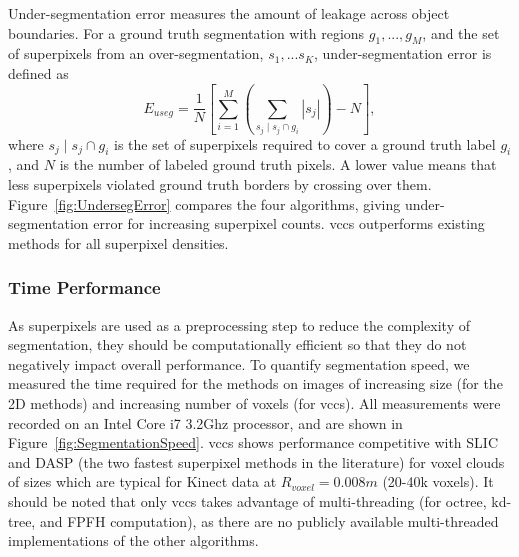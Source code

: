 Under-segmentation error measures the amount of leakage across object boundaries. For a ground truth segmentation with regions $g_1,...,g_M$, and the set of superpixels from an over-segmentation, $s_1,...s_K$, under-segmentation error is defined as 
\begin{equation}
\label{eqn:UndersegError}
{E}_{useg}=\frac{1}{N} \left[ \sum_{i=1}^{M}{\left(\sum_{s_j \mid s_j \cap g_i}{|s_j|}\right)-N} \right],
\end{equation}
where $s_j \mid s_j \cap g_i$ is the set of superpixels required to cover a ground truth label $g_i$, and $N$ is the number of labeled ground truth pixels. A lower value means that less superpixels violated ground truth borders by crossing over them. Figure~\ref{fig:UndersegError} compares the four algorithms, giving under-segmentation error for increasing superpixel counts. \gls{vccs} outperforms existing methods for all superpixel densities. 

\subsubsection{Time Performance}
As superpixels are used as a preprocessing step to reduce the complexity of segmentation, they should be computationally efficient so that they do not negatively impact overall performance. To quantify segmentation speed, we measured the time required for the methods on images of increasing size (for the 2D methods) and increasing number of voxels (for \gls{vccs}). All measurements were recorded on an Intel Core i7 3.2Ghz processor, and are shown in Figure~\ref{fig:SegmentationSpeed}. \gls{vccs} shows performance competitive with SLIC and DASP (the two fastest superpixel methods in the literature) for voxel clouds of sizes which are typical for Kinect data at ${R}_{voxel}=0.008m$ (20-40k voxels). It should be noted that only \gls{vccs} takes advantage of multi-threading (for octree, kd-tree, and FPFH computation), as there are no publicly available multi-threaded implementations of the other algorithms.  

